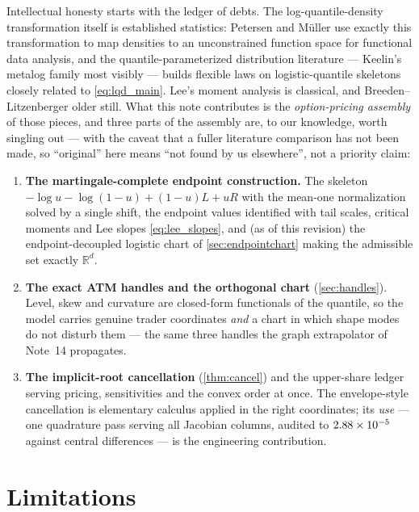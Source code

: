 \documentclass[11pt]{article}
\begin{document}
Intellectual honesty starts with the ledger of debts.  The
log-quantile-density transformation itself is established statistics:
Petersen and M\"uller \cite{PetersenMuller2016} use exactly this
transformation to map densities to an unconstrained function space for
functional data analysis, and the quantile-parameterized distribution
literature --- Keelin's metalog family \cite{Keelin2016} most visibly ---
builds flexible laws on logistic-quantile skeletons closely related to
\eqref{eq:lqd_main}.  Lee's moment analysis is classical, and
Breeden--Litzenberger older still.  What this note contributes is the
\emph{option-pricing assembly} of those pieces, and three parts of the
assembly are, to our knowledge, worth singling out --- with the caveat that
a fuller literature comparison has not been made, so ``original'' here
means ``not found by us elsewhere'', not a priority claim:
\begin{enumerate}[leftmargin=1.6em]
\item \textbf{The martingale-complete endpoint construction.}  The skeleton
$-\log u-\log(1-u)+(1-u)L+uR$ with the mean-one normalization solved by a
single shift, the endpoint values identified with tail scales, critical
moments and Lee slopes \eqref{eq:lee_slopes}, and (as of this revision) the
endpoint-decoupled logistic chart of \cref{sec:endpointchart} making the
admissible set exactly $\mathbb{R}^{d}$.
\item \textbf{The exact ATM handles and the orthogonal chart}
(\cref{sec:handles}).  Level, skew and curvature are closed-form functionals
of the quantile, so the model carries genuine trader coordinates \emph{and}
a chart in which shape modes do not disturb them --- the same three handles
the graph extrapolator of Note~14 propagates.
\item \textbf{The implicit-root cancellation} (\cref{thm:cancel}) and the
upper-share ledger serving pricing, sensitivities and the convex order at
once.  The envelope-style cancellation is elementary calculus applied in
the right coordinates; its \emph{use} --- one quadrature pass serving all
Jacobian columns, audited to $2.88\times10^{-5}$ against central
differences --- is the engineering contribution.
\end{enumerate}

\section{Limitations}
\label{sec:limits}
\end{document}
